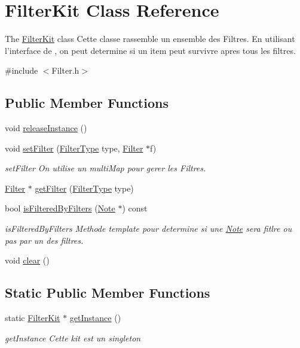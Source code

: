 \hypertarget{class_filter_kit}{\section{Filter\-Kit Class Reference}
\label{class_filter_kit}
}


The \hyperlink{class_filter_kit}{Filter\-Kit} class Cette classe rassemble un ensemble des Filtres. En utilisant l'interface de , on peut determine si un item peut survivre apres tous les filtres.  




{\ttfamily \#include $<$Filter.\-h$>$}

\subsection*{Public Member Functions}
\begin{DoxyCompactItemize}
\item 
void \hyperlink{class_filter_kit_a7df389d3b1339045d517f37374ad0598}{release\-Instance} ()
\item 
void \hyperlink{class_filter_kit_aa55f33f9c597d9b099c8950ad473d563}{set\-Filter} (\hyperlink{_filter_8h_a7ef0ab496f57e183b484e62e2053c94f}{Filter\-Type} type, \hyperlink{class_filter}{Filter} $\ast$f)
\begin{DoxyCompactList}\small\item\em set\-Filter On utilise un multi\-Map pour gerer les Filtres. \end{DoxyCompactList}\item 
\hyperlink{class_filter}{Filter} $\ast$ \hyperlink{class_filter_kit_a511795701a1da8c735bf4e999c19b371}{get\-Filter} (\hyperlink{_filter_8h_a7ef0ab496f57e183b484e62e2053c94f}{Filter\-Type} type)
\item 
bool \hyperlink{class_filter_kit_a5c71b6761563fdc67f648a876baefa90}{is\-Filtered\-By\-Filters} (\hyperlink{class_note}{Note} $\ast$) const 
\begin{DoxyCompactList}\small\item\em is\-Filtered\-By\-Filters Methode template pour determine si une \hyperlink{class_note}{Note} sera fitlre ou pas par un des filtres. \end{DoxyCompactList}\item 
void \hyperlink{class_filter_kit_a72ce825c940ef16b9bdbd57f2109978f}{clear} ()
\end{DoxyCompactItemize}
\subsection*{Static Public Member Functions}
\begin{DoxyCompactItemize}
\item 
static \hyperlink{class_filter_kit}{Filter\-Kit} $\ast$ \hyperlink{class_filter_kit_a6bc95436648761e9dacd5f95aec31c94}{get\-Instance} ()
\begin{DoxyCompactList}\small\item\em get\-Instance Cette kit est un singleton \end{DoxyCompactList}\end{DoxyCompactItemize}


